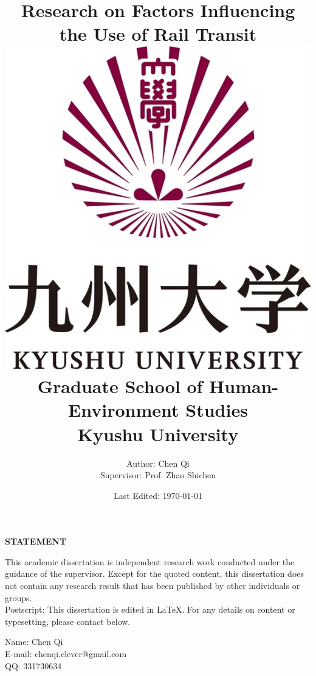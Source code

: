 \documentclass[12pt, twoside, a4paper]{book} %
\renewcommand{\baselinestretch}{1.5} %
\begin{document}
\title{
	{\Huge Research on Factors Influencing the Use of Rail Transit}\\
	{\vspace{3cm}}
	{\includegraphics[width=0.2\linewidth]{university.jpg}}\\
	{\vspace{2cm}}
	{\large Graduate School of Human-Environment Studies}\\
	{\large Kyushu University}
}
\author{
	{\large Author: Chen Qi}\\
	{\large Supervisor: Prof. Zhao Shichen}
	{\vspace{1cm}}
}
\date{\normalsize Last Edited: \today}
\maketitle

\centerline{\textbf{\Large STATEMENT}}
%
This academic dissertation is independent research work conducted under the guidance of the supervisor. Except for the quoted content, this dissertation does not contain any research result that has been published by other individuals or groups.\\
\newline
\newline
%
Postscript:
%
This dissertation is edited in \LaTeX. For any details on content or typesetting, please contact below.

\begin{flushright}
	Name: Chen Qi \\
	E-mail: chenqi.clever@gmail.com \\
	QQ: 331730634 \\
\end{flushright}

\renewcommand{\baselinestretch}{1.2} %
\fontsize{14pt}{14pt} %
\selectfont

\tableofcontents %
\listoffigures %
\listoftables %
\end{document}
